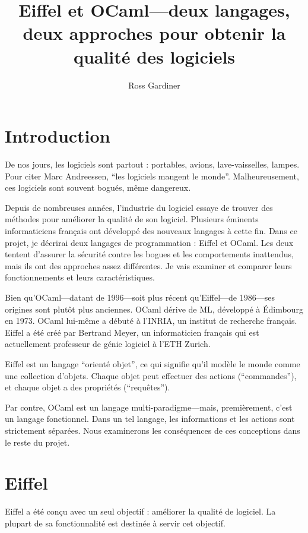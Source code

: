 \documentclass[french]{report}
\title{Eiffel et OCaml---deux langages, deux approches pour obtenir la qualité des logiciels}
\author{Ross Gardiner}
\begin{document}
\maketitle

\tableofcontents

\chapter{Introduction}

De nos jours, les logiciels sont partout : portables, avions, lave-vaisselles, lampes. Pour citer Marc Andreessen, \enquote{les logiciels mangent le monde}. Malheureusement, ces logiciels sont souvent bogués, m\^{e}me dangereux.

Depuis de nombreuses années, l’industrie du logiciel essaye de trouver des méthodes pour améliorer la qualité de son logiciel. Plusieurs éminents informaticiens français ont développé des nouveaux langages à cette fin. Dans ce projet, je décrirai deux langages de programmation : Eiffel et OCaml. Les deux tentent d’assurer la sécurité contre les bogues et les comportements inattendus, mais ils ont des approches assez différentes. Je vais examiner et comparer leurs fonctionnements et leurs caractéristiques.

Bien qu'OCaml---datant de 1996---soit plus récent qu'Eiffel---de 1986---ses origines sont plutôt plus anciennes.  OCaml dérive de ML, développé à Édimbourg en 1973. OCaml lui-m\^{e}me a débuté à l’INRIA, un institut de recherche français. Eiffel a été créé par Bertrand Meyer, un informaticien français qui est actuellement professeur de génie logiciel à l’ETH Zurich.

Eiffel est un langage \enquote{orienté objet}, ce qui signifie qu'il modèle le monde comme une collection d’objets. Chaque objet peut effectuer des actions (\enquote{commandes}), et chaque objet a des propriétés (\enquote{requ\^{e}tes}).

Par contre, OCaml est un langage multi-paradigme---mais, premièrement, c’est un langage fonctionnel. Dans un tel langage, les informations et les actions sont strictement séparées. Nous examinerons les conséquences de ces conceptions dans le reste du projet.

\chapter{Eiffel}

Eiffel a été conçu avec un seul objectif : améliorer la qualité de logiciel. La plupart de sa fonctionnalité est destinée à servir cet objectif.
 
\end{document}
